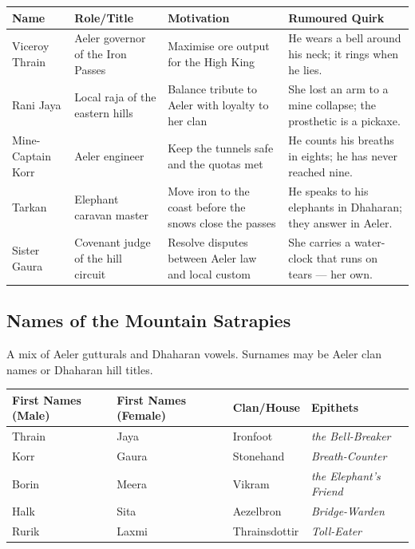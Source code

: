\begin{longtable}{|p{}|p{}|p{}|p{}|}
\hline
\textbf{Name} & \textbf{Role/Title} & \textbf{Motivation} & \textbf{Rumoured Quirk} \\
\hline
Viceroy Thrain & Aeler governor of the Iron Passes & Maximise ore output for the High King & He wears a bell around his neck; it rings when he lies. \\
\hline
Rani Jaya & Local raja of the eastern hills & Balance tribute to Aeler with loyalty to her clan & She lost an arm to a mine collapse; the prosthetic is a pickaxe. \\
\hline
Mine-Captain Korr & Aeler engineer & Keep the tunnels safe and the quotas met & He counts his breaths in eights; he has never reached nine. \\
\hline
Tarkan & Elephant caravan master & Move iron to the coast before the snows close the passes & He speaks to his elephants in Dhaharan; they answer in Aeler. \\
\hline
Sister Gaura & Covenant judge of the hill circuit & Resolve disputes between Aeler law and local custom & She carries a water-clock that runs on tears — her own. \\
\hline
\end{longtable}

\subsection*{Names of the Mountain Satrapies}
\label{sec:satrapies-names}

A mix of Aeler gutturals and Dhaharan vowels. Surnames may be Aeler clan names or Dhaharan hill titles.

\begin{longtable}{|p{}|p{}|p{}|p{}|}
\hline
\textbf{First Names (Male)} & \textbf{First Names (Female)} & \textbf{Clan/House} & \textbf{Epithets} \\
\hline
Thrain & Jaya & Ironfoot & \textit{the Bell-Breaker} \\
\hline
Korr & Gaura & Stonehand & \textit{Breath-Counter} \\
\hline
Borin & Meera & Vikram & \textit{the Elephant's Friend} \\
\hline
Halk & Sita & Aezelbron & \textit{Bridge-Warden} \\
\hline
Rurik & Laxmi & Thrainsdottir & \textit{Toll-Eater} \\
\hline
\end{longtable}

